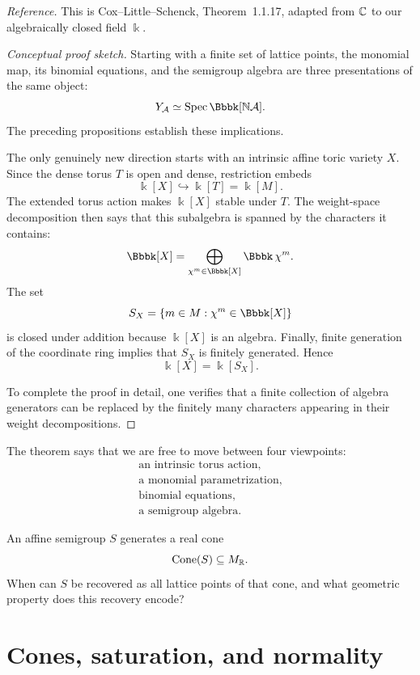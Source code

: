 \noindent
\textit{Reference.}
This is Cox--Little--Schenck, Theorem~1.1.17, adapted from \(\mathbb{C}\) to
our algebraically closed field \(\Bbbk\).

\begin{proof}[Conceptual proof sketch]
Starting with a finite set of lattice points, the monomial map,
its binomial equations, and the semigroup algebra are three
presentations of the same object:
\[
Y_{\mathcal A}
\simeq
\Spec\Bbbk[\NN\mathcal A].
\]
The preceding propositions establish these implications.

The only genuinely new direction starts with an intrinsic affine
toric variety \(X\). Since the dense torus \(T\) is open and dense,
restriction embeds
\[
\Bbbk[X]\hookrightarrow\Bbbk[T]=\Bbbk[M].
\]
The extended torus action makes \(\Bbbk[X]\) stable under \(T\).
The weight-space decomposition then says that this subalgebra is
spanned by the characters it contains:
\[
\Bbbk[X]
=
\bigoplus_{\character{m}\in\Bbbk[X]}
\Bbbk\,\character{m}.
\]
The set
\[
S_X
=
\{m\in M:\character{m}\in\Bbbk[X]\}
\]
is closed under addition because \(\Bbbk[X]\) is an algebra. Finally,
finite generation of the coordinate ring implies that \(S_X\) is
finitely generated. Hence
\[
\Bbbk[X]=\Bbbk[S_X].
\]

To complete the proof in detail, one verifies that a finite collection
of algebra generators can be replaced by the finitely many characters
appearing in their weight decompositions.
\end{proof}

The theorem says that we are free to move between four viewpoints:
\[
\begin{array}{c}
\text{an intrinsic torus action},
\\
\text{a monomial parametrization},
\\
\text{binomial equations},
\\
\text{a semigroup algebra}.
\end{array}
\]

\begin{guidingquestion}
An affine semigroup \(S\) generates a real cone
\[
\operatorname{Cone}(S)\subseteq M_{\mathbb{R}}.
\]
When can \(S\) be recovered as all lattice points of that cone, and
what geometric property does this recovery encode?
\end{guidingquestion}


\section{Cones, saturation, and normality}
\label{sec:cones-saturation-normality}

